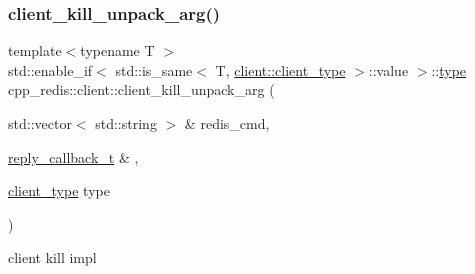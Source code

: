 \mbox{\label{classcpp__redis_1_1client_a6a1bfc9e37967c4a602d917f87a5b929}} 
\subsubsection{\texorpdfstring{client\+\_\+kill\+\_\+unpack\+\_\+arg()}{client\_kill\_unpack\_arg()}\hspace{0.1cm}{\footnotesize\ttfamily [1/4]}}
{\footnotesize\ttfamily template$<$typename T $>$ \\
std\+::enable\+\_\+if$<$ std\+::is\+\_\+same$<$ T, \hyperlink{classcpp__redis_1_1client_a388877b01b4e045cddb138e70a68e000}{client\+::client\+\_\+type} $>$\+::value $>$\+::\hyperlink{classcpp__redis_1_1client_ac284ea9a5c0e95d49a675403aaf4847c}{type} cpp\+\_\+redis\+::client\+::client\+\_\+kill\+\_\+unpack\+\_\+arg (\begin{DoxyParamCaption}\item[{std\+::vector$<$ std\+::string $>$ \&}]{redis\+\_\+cmd,  }\item[{\hyperlink{classcpp__redis_1_1client_a061a1140d36d2eaeda82b09a0bb3f9f2}{reply\+\_\+callback\+\_\+t} \&}]{,  }\item[{\hyperlink{classcpp__redis_1_1client_a388877b01b4e045cddb138e70a68e000}{client\+\_\+type}}]{type }\end{DoxyParamCaption})\hspace{0.3cm}{\ttfamily [private]}}



client kill impl 

\mbox{\label{classcpp__redis_1_1client_a9b6a6f361db2ca27d4714447088729fe}} 
